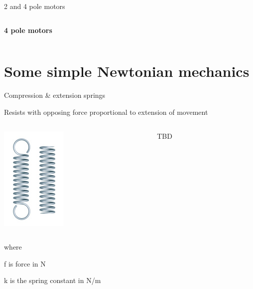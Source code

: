 \documentclass[compress]{beamer}
\begin{document}
\begin{frame}{2 and 4 pole motors}
\begin{columns}
\begin{column}{0.5\linewidth}
\begin{center}
                \textbf{4 pole motors}
            \end{center}
        \end{column}
    \end{columns}


\end{frame}

\section{Some simple Newtonian mechanics}

\begin{frame}{Compression \& extension springs}

Resists with opposing force proportional to extension of movement


    \begin{columns}
        \begin{column}{0.5\linewidth}
            \begin{center}
                \includegraphics[height=0.3\paperheight]{image52}
            \end{center}
        \end{column}
        \begin{column}{0.5\linewidth}
            TBD
        \end{column}
    \end{columns}

where

f is force in N

k is the spring constant in N/m

\end{frame}
\end{document}
